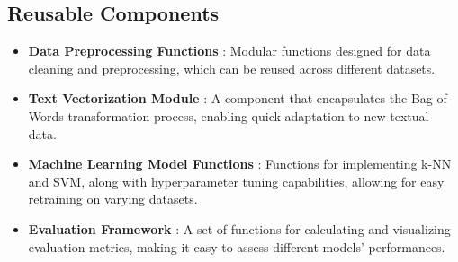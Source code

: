 \subsection{Reusable Components}
\begin{itemize}
    \item \textbf{Data Preprocessing Functions} :
    \noindent
    Modular functions designed for data cleaning and preprocessing, which can be reused across different datasets.
    \item \textbf{Text Vectorization Module} :
    \noindent
    A component that encapsulates the Bag of Words transformation process, enabling quick adaptation to new textual data.
    \item \textbf{Machine Learning Model Functions} :
    \noindent
    Functions for implementing k-NN and SVM, along with hyperparameter tuning capabilities, allowing for easy retraining on varying datasets.
    \item \textbf{Evaluation Framework} :
    \noindent
    A set of functions for calculating and visualizing evaluation metrics, making it easy to assess different models' performances.
\end{itemize}

